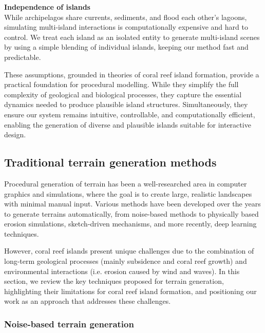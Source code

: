 \begin{Itemize}
    \Item{} \textbf{Independence of islands} \\
    While archipelagos share currents, sediments, and flood each other's lagoons, simulating multi-island interactions is computationally expensive and hard to control. We treat each island as an isolated entity to generate multi-island scenes by using a simple blending of individual islands, keeping our method fast and predictable.

\end{Itemize}

\midConclusion

These assumptions, grounded in theories of coral reef island formation, provide a practical foundation for procedural modelling. While they simplify the full complexity of geological and biological processes, they capture the essential dynamics needed to produce plausible island structures. Simultaneously, they ensure our system remains intuitive, controllable, and computationally efficient, enabling the generation of diverse and plausible islands suitable for interactive design.





\subsection{Traditional terrain generation methods}
\label{sec:coral-island-sota-traditional}

Procedural generation of terrain has been a well-researched area in computer graphics and simulations, where the goal is to create large, realistic landscapes with minimal manual input. Various methods have been developed over the years to generate terrains automatically, from noise-based methods to physically based erosion simulations, sketch-driven mechanisms, and more recently, deep learning techniques.

However, coral reef islands present unique challenges due to the combination of long-term geological processes (mainly subsidence and coral reef growth) and environmental interactions (i.e. erosion caused by wind and waves). In this section, we review the key techniques proposed for terrain generation, highlighting their limitations for coral reef island formation, and positioning our work as an approach that addresses these challenges.

\subsubsection{Noise-based terrain generation}

